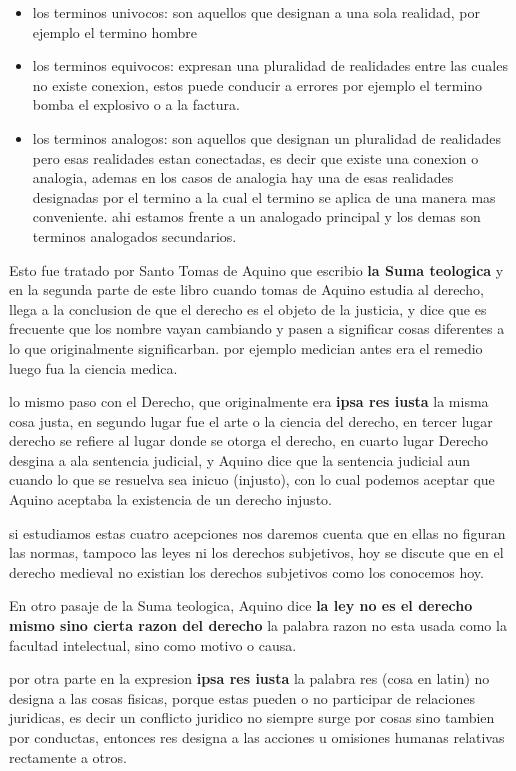 \documentclass[12pt]{book}
\begin{document}
\begin{itemize}
\item los terminos univocos: son aquellos que designan a una sola realidad, por ejemplo el termino hombre
\item los terminos equivocos: expresan una pluralidad de realidades entre las cuales no existe conexion, estos puede conducir a errores por ejemplo el termino bomba el explosivo o a la factura.
\item los terminos analogos: son aquellos que designan un pluralidad de realidades pero esas realidades estan conectadas, es decir que existe una conexion o analogia, ademas en los casos de analogia hay una de esas realidades designadas por el termino a la cual el termino se aplica de una manera mas conveniente. ahi estamos frente a un analogado principal y los demas son terminos analogados secundarios.
\end{itemize}

Esto fue tratado por Santo Tomas de Aquino que escribio \textbf{la Suma teologica} y en la segunda parte de este libro cuando tomas de Aquino estudia al derecho, llega a la  conclusion de que el derecho es el objeto de la justicia, y dice que es frecuente que los nombre vayan cambiando y pasen a significar cosas diferentes a lo que originalmente significarban.
por ejemplo medician antes era el remedio luego fua la ciencia medica.

lo mismo paso con el Derecho, que originalmente era \textbf{ipsa res iusta} la misma cosa justa, en segundo lugar fue el arte o la ciencia del derecho, en tercer lugar derecho se refiere al lugar donde se otorga el derecho, en cuarto lugar Derecho desgina a ala sentencia judicial, y Aquino dice que la sentencia judicial aun cuando lo que se resuelva sea inicuo (injusto), con lo cual  podemos aceptar que Aquino aceptaba la existencia de un derecho injusto.

si estudiamos estas cuatro acepciones nos daremos cuenta que en ellas no figuran las normas, tampoco las leyes ni los derechos subjetivos, hoy se discute que en el derecho medieval no existian los derechos subjetivos como los conocemos hoy.

En otro pasaje de la Suma teologica, Aquino dice \textbf{la ley no es el derecho mismo sino cierta razon del derecho} la palabra razon no esta usada como la facultad intelectual, sino como motivo o causa.

por otra parte en la expresion \textbf{ipsa res iusta} la palabra res (cosa en latin) no designa a las cosas fisicas, porque estas pueden o no participar de relaciones juridicas, es decir un conflicto juridico no siempre surge por cosas sino  tambien por conductas, entonces res designa a las acciones u omisiones humanas relativas rectamente a otros.
\end{document}
